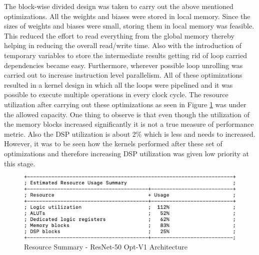 The block-wise divided design was taken to carry out the above mentioned optimizations. All the weights and biases were stored in local memory. Since the sizes of weights and biases were small, storing them in local memory was feasible. This reduced the effort to read everything from the global memory thereby helping in reducing the overall read/write time. Also with the introduction of temporary variables to store the intermediate results getting rid of loop carried dependencies became easy. Furthermore, wherever possible loop unrolling was carried out to increase instruction level parallelism. All of these optimizations resulted in a kernel design in which all the loops were pipelined and it was possible to execute multiple operations in every clock cycle.
\newline
The resource utilization after carrying out these optimizations as seen in Figure \ref{fig:ResNet50_optv1_usage} was under the allowed capacity. One thing to observe is that even though the utilization of the memory blocks increased significantly it is not a true measure of performance metric. Also the DSP utilization is about 2\% which is less and needs to increased. However, it was to be seen how the kernels performed after these set of optimizations and therefore increasing DSP utilization was given low priority at this stage.

\begin{figure}[!htb]
 \includegraphics[width=\textwidth,height=\textheight,keepaspectratio]{img/resnetv1ru.png}
 \caption{Resource Summary - ResNet-50 Opt-V1 Architecture}
 \label{fig:ResNet50_optv1_usage}
\end{figure}

